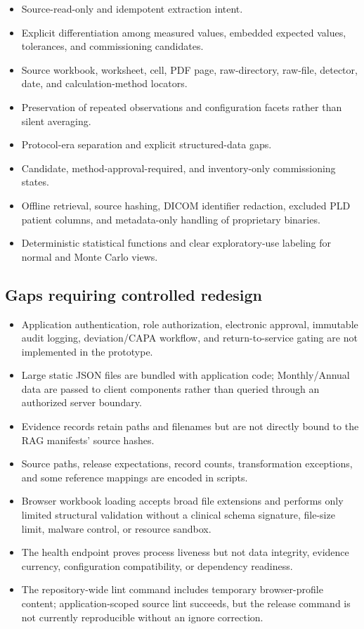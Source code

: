 \documentclass[11pt,letterpaper]{article}
\begin{document}
\begin{itemize}
\item Source-read-only and idempotent extraction intent.
\item Explicit differentiation among measured values, embedded expected values, tolerances, and commissioning candidates.
\item Source workbook, worksheet, cell, PDF page, raw-directory, raw-file, detector, date, and calculation-method locators.
\item Preservation of repeated observations and configuration facets rather than silent averaging.
\item Protocol-era separation and explicit structured-data gaps.
\item Candidate, method-approval-required, and inventory-only commissioning states.
\item Offline retrieval, source hashing, DICOM identifier redaction, excluded PLD patient columns, and metadata-only handling of proprietary binaries.
\item Deterministic statistical functions and clear exploratory-use labeling for normal and Monte Carlo views.
\end{itemize}

\subsection{Gaps requiring controlled redesign}

\begin{itemize}
\item Application authentication, role authorization, electronic approval, immutable audit logging, deviation/CAPA workflow, and return-to-service gating are not implemented in the prototype.
\item Large static JSON files are bundled with application code; Monthly/Annual data are passed to client components rather than queried through an authorized server boundary.
\item Evidence records retain paths and filenames but are not directly bound to the RAG manifests' source hashes.
\item Source paths, release expectations, record counts, transformation exceptions, and some reference mappings are encoded in scripts.
\item Browser workbook loading accepts broad file extensions and performs only limited structural validation without a clinical schema signature, file-size limit, malware control, or resource sandbox.
\item The health endpoint proves process liveness but not data integrity, evidence currency, configuration compatibility, or dependency readiness.
\item The repository-wide lint command includes temporary browser-profile content; application-scoped source lint succeeds, but the release command is not currently reproducible without an ignore correction.
\end{itemize}
\end{document}
